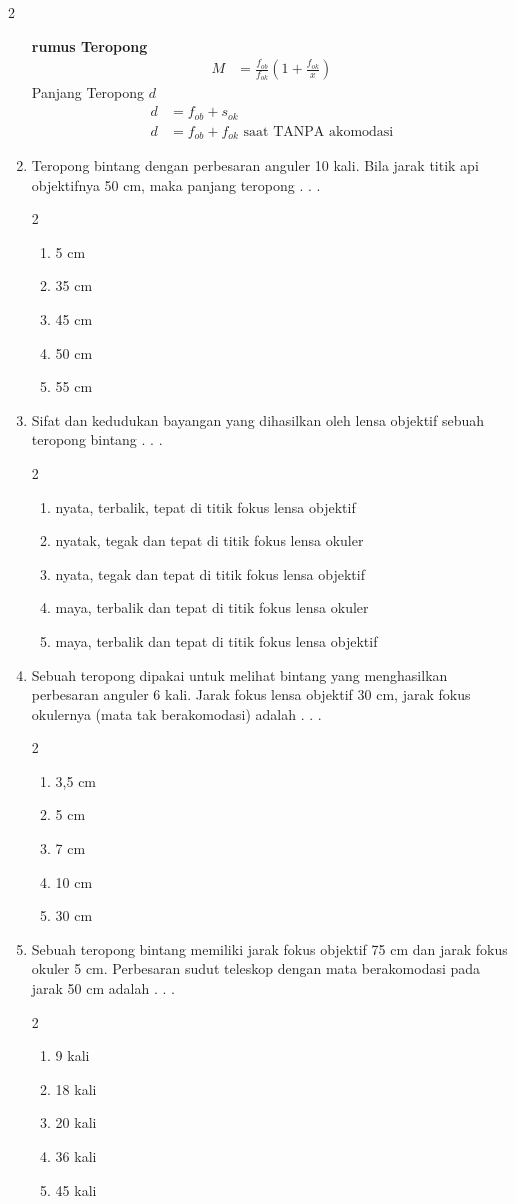 \documentclass[10pt,a4paper]{extarticle}
\newcommand{\pilgani}[1]{                            \vspace{-0.3cm}\begin{multicols}{2}
 \begin{enumerate}[label=\Alph*., itemsep=0pt,topsep=0pt,leftmargin=*,align=Center]#1                     \end{enumerate}
 \phantom{ini cuma sapi, wedus, dan ayam}
 \end{multicols}}
\begin{document}
\begin{multicols*}{2}
\begin{enumerate}
\textbf{rumus Teropong}
\begin{align*}
M &= \frac{f_{ob}}{f_{ok}} \left( 1 +\frac{f_{ok}}{x}\right)
\end{align*}
Panjang Teropong $d$
\begin{align*}
d&=f_{ob} + s_{ok} \\
d &= f_{ob} + f_{ok} \text{ saat TANPA akomodasi}
\end{align*}

\item Teropong bintang dengan perbesaran anguler 10 kali. Bila jarak titik api objektifnya 50 cm, maka panjang teropong . . . 
\pilgani{
	\item 5 cm
	\item 35 cm
	\item 45 cm
	\item 50 cm
	\item 55 cm }
\vspace{3cm}

\item Sifat dan kedudukan bayangan yang dihasilkan oleh lensa objektif sebuah teropong bintang . . .
\pilgani{
	\item nyata, terbalik, tepat di titik fokus lensa objektif
	\item nyatak, tegak dan tepat di titik fokus lensa okuler
	\item nyata, tegak dan tepat di titik fokus lensa objektif
	\item maya, terbalik dan tepat di titik fokus lensa okuler
	\item maya, terbalik dan tepat di titik fokus lensa objektif
}
\vspace{2cm}

\item Sebuah teropong dipakai untuk melihat bintang yang menghasilkan perbesaran anguler 6 kali. Jarak fokus lensa objektif 30 cm, jarak fokus okulernya (mata tak berakomodasi) adalah . . .
\pilgani{
	\item 3,5 cm
	\item 5 cm
	\item 7 cm
	\item 10 cm
	\item 30 cm }
\vspace{3cm}

\item Sebuah teropong bintang memiliki jarak fokus objektif 75 cm dan jarak fokus okuler 5 cm. Perbesaran sudut teleskop dengan mata berakomodasi pada jarak 50 cm adalah . . .
\pilgani{
	\item 9 kali
	\item 18 kali
	\item 20 kali
	\item 36 kali
	\item 45 kali }


\end{enumerate}
\end{multicols*}
\end{document}
